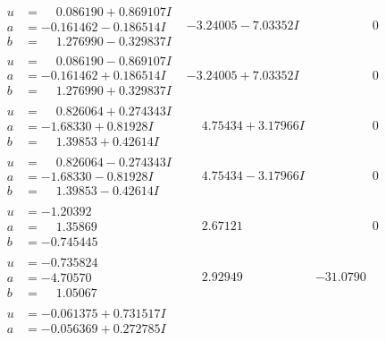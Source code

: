 \documentclass[1p]{elsarticle_modified}
\theoremstyle{definition}
\begin{document}
$$\begin{array}{c|c|c}
\begin{aligned}
u &= \phantom{-}0.086190 + 0.869107 I \\
a &= -0.161462 - 0.186514 I \\
b &= \phantom{-}1.276990 - 0.329837 I\end{aligned}
 & -3.24005 - 7.03352 I & \phantom{-0.000000 } 0 \\ \hline\begin{aligned}
u &= \phantom{-}0.086190 - 0.869107 I \\
a &= -0.161462 + 0.186514 I \\
b &= \phantom{-}1.276990 + 0.329837 I\end{aligned}
 & -3.24005 + 7.03352 I & \phantom{-0.000000 } 0 \\ \hline\begin{aligned}
u &= \phantom{-}0.826064 + 0.274343 I \\
a &= -1.68330 + 0.81928 I \\
b &= \phantom{-}1.39853 + 0.42614 I\end{aligned}
 & \phantom{-}4.75434 + 3.17966 I & \phantom{-0.000000 } 0 \\ \hline\begin{aligned}
u &= \phantom{-}0.826064 - 0.274343 I \\
a &= -1.68330 - 0.81928 I \\
b &= \phantom{-}1.39853 - 0.42614 I\end{aligned}
 & \phantom{-}4.75434 - 3.17966 I & \phantom{-0.000000 } 0 \\ \hline\begin{aligned}
u &= -1.20392\phantom{ +0.000000I} \\
a &= \phantom{-}1.35869\phantom{ +0.000000I} \\
b &= -0.745445\phantom{ +0.000000I}\end{aligned}
 & \phantom{-}2.67121\phantom{ +0.000000I} & \phantom{-0.000000 } 0 \\ \hline\begin{aligned}
u &= -0.735824\phantom{ +0.000000I} \\
a &= -4.70570\phantom{ +0.000000I} \\
b &= \phantom{-}1.05067\phantom{ +0.000000I}\end{aligned}
 & \phantom{-}2.92949\phantom{ +0.000000I} & -31.0790\phantom{ +0.000000I} \\ \hline\begin{aligned}
u &= -0.061375 + 0.731517 I \\
a &= -0.056369 + 0.272785 I \\

\end{aligned}
\end{array}$$
\end{document}

